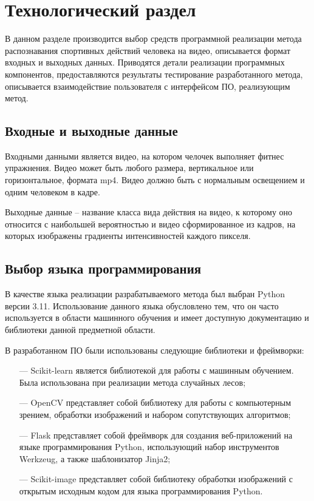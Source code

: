 \chapter{Технологический раздел}
В данном разделе производится выбор средств программной реализации метода распознавания спортивных действий человека на видео, описывается формат входных и выходных данных. Приводятся детали реализации программных компонентов, предоставляются результаты тестирование разработанного метода, описывается взаимодействие пользователя с интерфейсом ПО, реализующим метод.  
\section{Входные и выходные данные}

Входными данными является видео, на котором челочек выполняет фитнес упражнения. Видео может быть любого размера, вертикальное или горизонтальное, формата mp4. Видео должно быть с нормальным освещением и одним человеком в кадре.

Выходные данные -- название класса вида действия на видео, к которому оно относится с наибольшей вероятностью и видео сформированное из кадров, на которых изображены градиенты интенсивностей каждого пикселя.

\section{Выбор языка программирования}

В качестве языка реализации разрабатываемого метода был выбран
Python версии 3.11. Использование данного языка обусловлено тем, что он часто используется в области машинного
обучения и имеет доступную документацию и библиотеки данной предметной области.

В разработанном ПО были использованы следующие библиотеки и фреймворки:

\begin{itemize}
	\item[---]  Scikit-learn \cite{sklearn} является библиотекой для работы с машинным обучением. Была использована при реализации метода случайных лесов;
	\item[---]  OpenCV \cite{opencv} представляет собой библиотеку для
	работы с компьютерным зрением, обработки изображений и набором сопутствующих алгоритмов;
	\item[---]  Flask \cite{flask} представляет собой фреймворк для создания веб-приложений на языке программирования Python, использующий набор инструментов Werkzeug, а также шаблонизатор Jinja2;
	\item[---]  Scikit-image \cite{skimage} представляет собой библиотеку обработки изображений с открытым исходным кодом для языка программирования Python.
\end{itemize}


